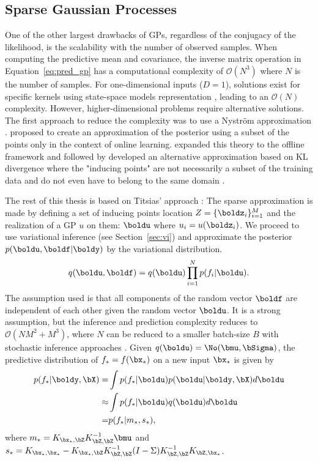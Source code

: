 \subsection{Sparse Gaussian Processes}
\label{sec:sparsegps}
One of the other largest drawbacks of \ac{GPs}, regardless of the conjugacy of the likelihood, is the scalability with the number of observed samples.
When computing the predictive mean and covariance, the inverse matrix operation in Equation~\ref{eq:pred_gp} has a computational complexity of $\mathcal{O}(N^3)$ where $N$ is the number of samples.
For one-dimensional inputs ($D=1$), solutions exist for specific kernels using state-space models representation \cite{pmlr-v9-turner10a,solinInfiniteHorizonGaussianProcesses2018}, leading to an $\mathcal{O}(N)$ complexity.
However, higher-dimensional problems require alternative solutions.
The first approach to reduce the complexity was to use a Nystr\"om approximation \cite{williams2002observations}.
\citet{csato2002sparse} proposed to create an approximation of the posterior using a subset of the points only in the context of online learning.
\citet{snelsonSparseGaussianProcesses2009} expanded this theory to the offline framework and \citet{csato2002gaussian} followed by \citet{Titsias2009} developed an alternative approximation based on KL divergence where the "inducing points" are not necessarily a subset of the training data and do not even have to belong to the same domain \cite{NIPS2009_5ea1649a, vdw2020framework}.

The rest of this thesis is based on Titsias' approach \cite{Titsias2009}:
The sparse approximation is made by defining a set of inducing points location $Z=\{\boldz_i\}_{i=1}^M$ and the realization of a \ac{GP} $u$ on them: $\boldu$ where $u_i = u(\boldz_i)$.
We proceed to use variational inference (see Section~\ref{sec:vi}) and approximate the posterior $p(\boldu,\boldf|\boldy)$ by the variational distribution.
\begin{align}
    q(\boldu,\boldf) = q(\boldu)\prod_{i=1}^N p(f_i|\boldu).
    \label{eq:titsias_assumption}
\end{align}
The assumption used is that all components of the random vector $\boldf$ are independent of each other given the random vector $\boldu$.
It is a strong assumption, but the inference and prediction complexity reduces to $\mathcal{O}(NM^2 + M^3)$, where $N$ can be reduced to a smaller batch-size $B$ with stochastic inference approaches \cite{Hensman2013, Hensman2015}.
Given $q(\boldu) = \No(\bmu,\bSigma)$, the predictive distribution of $f_*=f(\bx_*)$ on a new input $\bx_*$ is given by
\begin{align*}
    p(f_*|\boldy,\bX) =& \int p(f_*|\boldu) p(\boldu|\boldy,\bX)d\boldu\\
    \approx& \int p(f_*|\boldu) q(\boldu)d\boldu\\
    =& p(f_*|m_*,s_*),
\end{align*}
where $m_* = K_{\bx_*,\bZ} K^{-1}_{\bZ,\bZ} \bmu$ and $s_* = K_{\bx_*,\bx_*} - K_{\bx_*,\bZ}K_{\bZ,\bZ}^{-1}(I - \Sigma) K^{-1}_{\bZ,\bZ}K_{\bZ,\bx_*}$.

